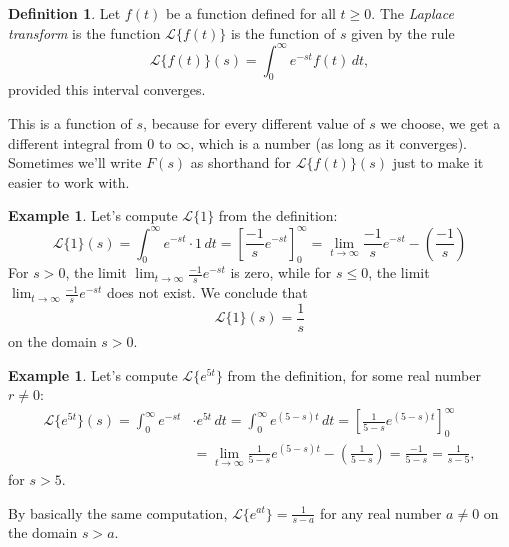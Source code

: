 \documentclass[12pt]{amsart}
\numberwithin{equation}{section}
\theoremstyle{plain} %
\theoremstyle{definition}
\newtheorem{defn}[equation]{Definition}
\newtheorem{ex}[equation]{Example}
\theoremstyle{remark}
\newcommand{\LA}[1]{\mathcal{L}\{ #1 \}}
\begin{document}
\begin{defn} Let $f(t)$ be a function defined for all $t\geq 0$. The \emph{Laplace transform} is the function $\LA{f(t)}$ is the function of $s$ given by the rule
\[ \LA{f(t)}(s) = \int_0^\infty e^{-st} f(t) \, dt,\]
provided this interval converges.
\end{defn}

This is a function of $s$, because for every different value of $s$ we choose, we get a different integral from $0$ to $\infty$, which is a number (as long as it converges). Sometimes we'll write $F(s)$ as shorthand for $ \LA{f(t)}(s)$ just to make it easier to work with.


\begin{ex} Let's compute $\LA{1}$ from the definition:
\[ \LA{1}(s) = \int_0^\infty e^{-st} \cdot 1 \, dt = \left[ \frac{-1}{s} e^{-st} \right]_{0}^{\infty} = \lim_{t\to\infty}\frac{-1}{s} e^{-st} - \left(\frac{-1}{s}\right)\]
For $s>0$, the limit $\lim_{t\to\infty}\frac{-1}{s} e^{-st}$ is zero, while for $s \leq 0$, the limit $\lim_{t\to\infty}\frac{-1}{s} e^{-st}$ does not exist. We conclude that
\[ \LA{1}(s) = \frac{1}{s}\]
on the domain $s>0$.
\end{ex}

\begin{ex} Let's compute $\LA{e^{5t}}$ from the definition, for some real number $r\neq 0$:
\begin{align*} \LA{e^{5t}}(s) = \int_0^\infty e^{-st} &\cdot e^{5t} \, dt = \int_0^\infty e^{(5-s)t} \, dt = \left[ \frac{1}{5-s} e^{(5-s)t} \right]_{0}^{\infty} \\&= \lim_{t\to\infty}\frac{1}{5-s} e^{(5-s)t} - \left(\frac{1}{5-s}\right) = \frac{-1}{5-s} = \frac{1}{s-5},\end{align*}
for $s>5$.

By basically the same computation, $\LA{e^{at}} = \frac{1}{s-a}$ for any real number $a\neq 0$ on the domain $s>a$.
\end{ex}

\renewcommand{\arraystretch}{2.5}
\end{document}
